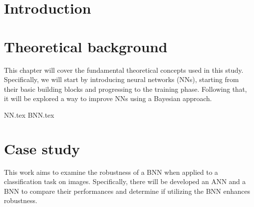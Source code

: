 \documentclass[
	a4paper,
	cleardoublepage=empty,
	headings=twolinechapter,
	numbers=autoenddot,
]{scrbook}
\begin{document}
	\frontmatter
	
	\begin{frontespizio}
		\Margini{3cm}{3cm}{3cm}{3cm}
		\Punteggiatura{}
		\begin{Preambolo*}
			\usepackage[english]{babel}
			\usepackage[T1]{fontenc}
			\usepackage[utf8]{inputenc}
			\usepackage{microtype}
			\usepackage{lmodern}
			\graphicspath{{img/}}
			
			\renewcommand{\frontinstitutionfont}{\fontsize{14}{17}\bfseries\scshape}
			\renewcommand{\fronttitlefont}{\fontsize{17}{21}\bfseries\scshape}
			\renewcommand{\frontfootfont}{\fontsize{12}{14}\bfseries\scshape}
		\end{Preambolo*}
	\end{frontespizio}
	
	\tableofcontents
	\listoffigures
	\mainmatter
	
	\chapter*{Introduction}
	\chapter{Theoretical background}
	This chapter will cover the fundamental theoretical concepts used in this study. Specifically, we will start by introducing neural networks (NNs), starting from their basic building blocks and progressing to the training phase. Following that, it will be explored a way to improve NNs using a Bayesian approach.
	
	{NN.tex}
	{BNN.tex}
		
	\chapter{Case study}
	This work aims to examine the robustness of a BNN when applied to a classification task on images. Specifically, there will be developed an ANN and a BNN to compare their performances and determine if utilizing the BNN enhances robustness.
	
\end{document}
